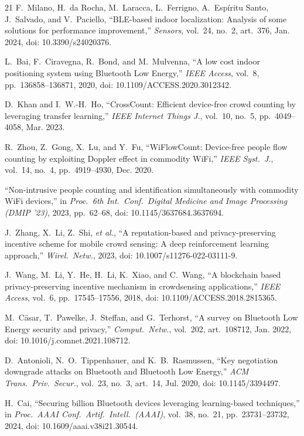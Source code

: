 \documentclass[journal,10pt]{IEEEtran}
\begin{document}
\begin{thebibliography}{21}
 F.~Milano, H.~da Rocha, M.~Laracca, L.~Ferrigno,
A.~Esp\'iritu Santo, J.~Salvado, and V.~Paciello, ``BLE-based indoor
localization: Analysis of some solutions for performance improvement,''
\emph{Sensors}, vol.~24, no.~2, art.~376, Jan. 2024, doi: 10.3390/s24020376.

 L.~Bai, F.~Ciravegna, R.~Bond, and M.~Mulvenna, ``A low cost
indoor positioning system using Bluetooth Low Energy,'' \emph{IEEE Access},
vol.~8, pp.~136858--136871, 2020, doi: 10.1109/ACCESS.2020.3012342.

 D.~Khan and I.~W.-H.~Ho, ``CrossCount: Efficient device-free
crowd counting by leveraging transfer learning,'' \emph{IEEE Internet Things
J.}, vol.~10, no.~5, pp.~4049--4058, Mar. 2023.

 R.~Zhou, Z.~Gong, X.~Lu, and Y.~Fu, ``WiFlowCount:
Device-free people flow counting by exploiting Doppler effect in commodity
WiFi,'' \emph{IEEE Syst.~J.}, vol.~14, no.~4, pp.~4919--4930, Dec. 2020.

 ``Non-intrusive people counting and identification
simultaneously with commodity WiFi devices,'' in \emph{Proc.\ 6th Int.\ Conf.\
Digital Medicine and Image Processing (DMIP '23)}, 2023, pp.~62--68, doi:
10.1145/3637684.3637694.

 J.~Zhang, X.~Li, Z.~Shi, \emph{et al.}, ``A reputation-based
and privacy-preserving incentive scheme for mobile crowd sensing: A deep
reinforcement learning approach,'' \emph{Wirel.\ Netw.}, 2023, doi:
10.1007/s11276-022-03111-9.

 J.~Wang, M.~Li, Y.~He, H.~Li, K.~Xiao, and C.~Wang, ``A
blockchain based privacy-preserving incentive mechanism in crowdsensing
applications,'' \emph{IEEE Access}, vol.~6, pp.~17545--17556, 2018, doi:
10.1109/ACCESS.2018.2815365.

 M.~C\"asar, T.~Pawelke, J.~Steffan, and G.~Terhorst, ``A
survey on Bluetooth Low Energy security and privacy,'' \emph{Comput.\ Netw.},
vol.~202, art.~108712, Jan. 2022, doi: 10.1016/j.comnet.2021.108712.

 D.~Antonioli, N.~O.~Tippenhauer, and K.~B.~Rasmussen,
``Key negotiation downgrade attacks on Bluetooth and Bluetooth Low Energy,''
\emph{ACM Trans.\ Priv.\ Secur.}, vol.~23, no.~3, art.~14, Jul. 2020, doi:
10.1145/3394497.

 H.~Cai, ``Securing billion Bluetooth devices leveraging
learning-based techniques,'' in \emph{Proc.\ AAAI Conf.\ Artif.\ Intell.\
(AAAI)}, vol.~38, no.~21, pp.~23731--23732, 2024, doi:
10.1609/aaai.v38i21.30544.


\end{thebibliography}
\end{document}
